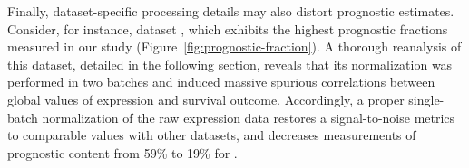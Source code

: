
Finally, dataset-specific processing details may also distort prognostic
estimates.  Consider, for instance, dataset , which exhibits
the highest prognostic fractions measured in our study
(Figure~\ref{fig:prognostic-fraction}).  A thorough reanalysis of this dataset,
detailed in the following section, reveals that its normalization was
performed in two batches and induced massive spurious correlations between
global values of expression and survival outcome.  Accordingly, a proper
single-batch normalization of the raw expression data restores a signal-to-noise
metrics to comparable values with other datasets, and decreases measurements of
prognostic content from 59\% to 19\% for .

